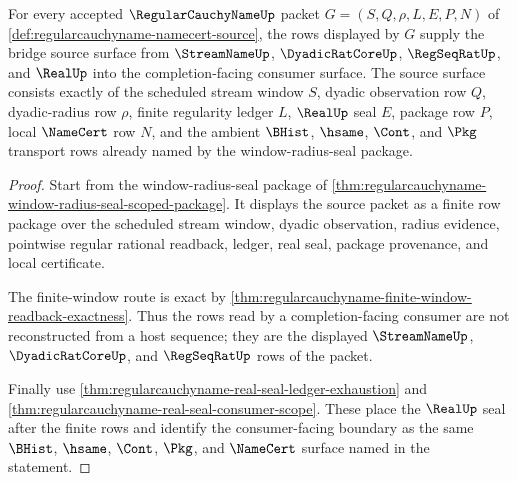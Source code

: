 \begin{theorem}
\label{thm:regularcauchyname-bridge-source-surface}
For every accepted $\RegularCauchyNameUp$ packet $G=(S,Q,\rho,L,E,P,N)$ of \autoref{def:regularcauchyname-namecert-source}, the rows displayed by $G$ supply the bridge source surface from $\StreamNameUp$, $\DyadicRatCoreUp$, $\RegSeqRatUp$, and $\RealUp$ into the completion-facing consumer surface. The source surface consists exactly of the scheduled stream window $S$, dyadic observation row $Q$, dyadic-radius row $\rho$, finite regularity ledger $L$, $\RealUp$ seal $E$, package row $P$, local $\NameCert$ row $N$, and the ambient $\BHist$, $\hsame$, $\Cont$, and $\Pkg$ transport rows already named by the window-radius-seal package.
\end{theorem}
\begin{proof}
Start from the window-radius-seal package of \autoref{thm:regularcauchyname-window-radius-seal-scoped-package}. It displays the source packet as a finite row package over the scheduled stream window, dyadic observation, radius evidence, pointwise regular rational readback, ledger, real seal, package provenance, and local certificate.

The finite-window route is exact by \autoref{thm:regularcauchyname-finite-window-readback-exactness}. Thus the rows read by a completion-facing consumer are not reconstructed from a host sequence; they are the displayed $\StreamNameUp$, $\DyadicRatCoreUp$, and $\RegSeqRatUp$ rows of the packet.

Finally use \autoref{thm:regularcauchyname-real-seal-ledger-exhaustion} and \autoref{thm:regularcauchyname-real-seal-consumer-scope}. These place the $\RealUp$ seal after the finite rows and identify the consumer-facing boundary as the same $\BHist$, $\hsame$, $\Cont$, $\Pkg$, and $\NameCert$ surface named in the statement.
\end{proof}

